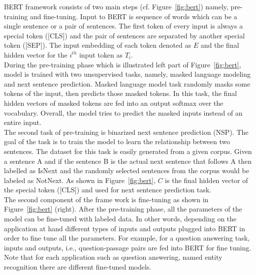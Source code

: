 \begin{itemize}
BERT framework consists of two main steps (cf. Figure~\ref{fig:bert}) namely, pre-training and fine-tuning. Input to BERT is sequence of words which can be a single sentence or a pair of sentences. The first token of every input is always a special token ([CLS]) and the pair of sentences are separated by another special token ([SEP]). The input embedding of each token denoted as $E$ and the final hidden vector for the $i^{th}$ input token as $T_i$. \\
During the pre-training phase which is illustrated left part of Figure~\ref{fig:bert}, model is trained with two unsupervised tasks, namely, masked language modeling and next sentence prediction.
Masked language model task randomly masks some tokens of the input, then predicts those masked tokens. In this task, the final hidden vectors of masked tokens are fed into an output softmax over the vocabulary. Overall, the model tries to predict the masked inputs instead of an entire input.\\
The second task of pre-training is binarized next sentence prediction (NSP). The goal of the task is to train the model to learn the relationship between two sentences. The dataset for this task is easily generated from a given corpus.
Given a sentence A and if the sentence B is the actual next sentence that follows A then labelled as IsNext and the randomly selected sentences from the corpus would be labeled as NotNext. As shown in Figure~\ref{fig:bert}, $C$ is the final hidden vector of the special token ([CLS]) and used for next sentence prediction task.\\
The second component of the frame work is fine-tuning as shown in Figure~\ref{fig:bert} (right). After the pre-training phase, all the parameters of the model can be fine-tuned with labeled data. In other words, depending on the application at hand different types of inputs and outputs plugged into BERT in order to fine tune all the parameters. For example, for a question answering task, inputs and outputs, i.e., question-passage pairs are fed into BERT for fine tuning. Note that for each application such as question answering, named entity recognition there are different fine-tuned models. 


\end{itemize}

%
